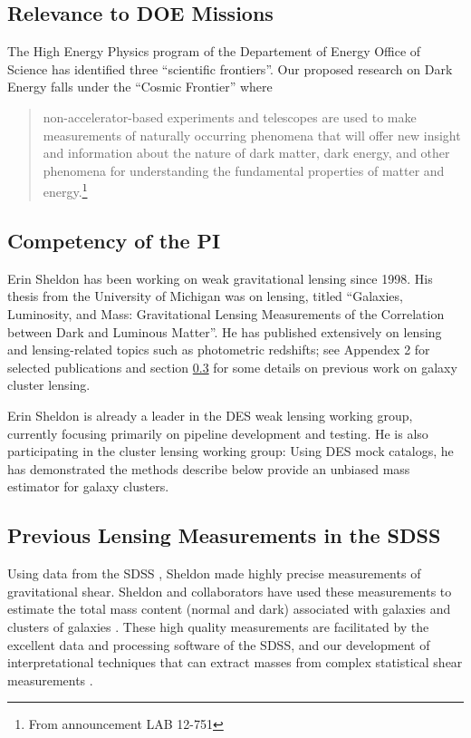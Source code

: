 \documentclass[12pt]{article}
\begin{document}
\subsection{Relevance to DOE Missions}

The High Energy Physics program of the Departement of Energy Office of Science
has identified three ``scientific frontiers''.  Our proposed research
on Dark Energy falls under the ``Cosmic Frontier'' where

\begin{quote} non-accelerator-based experiments and telescopes are used to make
    measurements of naturally occurring phenomena that will offer new insight
    and information about the nature of dark matter, dark energy, and other
    phenomena for understanding the fundamental properties of matter and
    energy.\footnote{From announcement LAB 12-751}

\end{quote}

\subsection{Competency of the PI}

Erin Sheldon has been working on weak gravitational lensing since 1998.  His
thesis from the University of Michigan was on lensing, titled ``Galaxies,
Luminosity, and Mass: Gravitational Lensing Measurements of the Correlation
between Dark and Luminous Matter''.  He has published extensively on lensing
and lensing-related topics such as photometric redshifts; see Appendex 2 for
selected publications and section \ref{sec:sdssold} for some details on
previous work on galaxy cluster lensing.

Erin Sheldon is already a leader in the DES weak lensing working group,
currently focusing primarily on pipeline development and testing.  He is also
participating in the cluster lensing working group: Using DES mock catalogs, he
has demonstrated the methods describe below provide an unbiased mass estimator
for galaxy clusters.

\subsection{Previous Lensing Measurements in the SDSS} \label{sec:sdssold}

Using data from the SDSS \cite{York00}, Sheldon made highly precise
measurements of gravitational shear. Sheldon and collaborators have used these
measurements to estimate the total mass content (normal and dark) associated
with galaxies and clusters of galaxies
\cite{fis00,Sheldon04,SheldonLensing07,JohnstonLensing07,SheldonM2L07}.  These
high quality measurements are facilitated by the excellent data and processing
software of the SDSS, and our development of interpretational techniques that
can extract masses from complex statistical shear measurements
\cite{JohnstonInvert07}.
\end{document}
